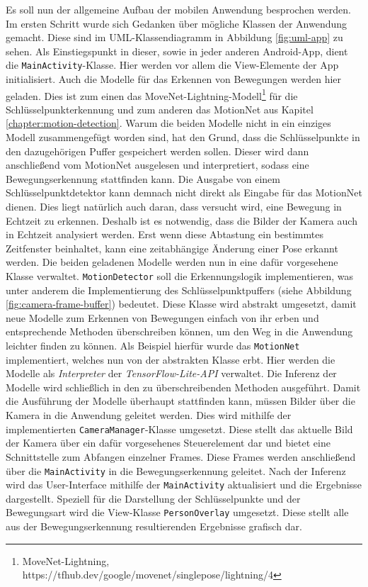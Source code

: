 Es soll nun der allgemeine Aufbau der mobilen Anwendung besprochen werden. Im
ersten Schritt wurde sich Gedanken über mögliche Klassen der Anwendung gemacht.
Diese sind im UML-Klassendiagramm in Abbildung \ref{fig:uml-app} zu sehen. Als
Einstiegspunkt in dieser, sowie in jeder anderen Android-App, dient die
\texttt{MainActivity}-Klasse. Hier werden vor allem die View-Elemente der App
initialisiert. Auch die Modelle für das Erkennen von Bewegungen werden hier
geladen. Dies ist zum einen das MoveNet-Lightning-Modell\footnote{MoveNet-Lightning, https://tfhub.dev/google/movenet/singlepose/lightning/4} für die
Schlüsselpunkterkennung und zum anderen das MotionNet aus Kapitel
\ref{chapter:motion-detection}. Warum die beiden Modelle nicht in ein einziges
Modell zusammengefügt worden sind, hat den Grund, dass die Schlüsselpunkte in
den dazugehörigen Puffer gespeichert werden sollen. Dieser wird dann
anschließend vom MotionNet ausgelesen und interpretiert, sodass eine
Bewegungserkennung stattfinden kann. Die Ausgabe von einem
Schlüsselpunktdetektor kann demnach nicht direkt als Eingabe für das MotionNet
dienen. Dies liegt natürlich auch daran, dass versucht wird, eine Bewegung in
Echtzeit zu erkennen. Deshalb ist es notwendig, dass die Bilder der Kamera auch
in Echtzeit analysiert werden. Erst wenn diese Abtastung ein bestimmtes
Zeitfenster beinhaltet, kann eine zeitabhängige Änderung einer Pose erkannt
werden. Die beiden geladenen Modelle werden nun in eine dafür vorgesehene Klasse
verwaltet. \texttt{MotionDetector} soll die Erkennungslogik implementieren, was
unter anderem die Implementierung des Schlüsselpunktpuffers (siehe Abbildung
\ref{fig:camera-frame-buffer}) bedeutet. Diese Klasse wird abstrakt umgesetzt,
damit neue Modelle zum Erkennen von Bewegungen einfach von ihr erben und
entsprechende Methoden überschreiben können, um den Weg in die Anwendung
leichter finden zu können. Als Beispiel hierfür wurde das \texttt{MotionNet}
implementiert, welches nun von der abstrakten Klasse erbt. Hier werden die
Modelle als \textit{Interpreter} der \textit{TensorFlow-Lite-API} verwaltet. Die
Inferenz der Modelle wird schließlich in den zu überschreibenden Methoden
ausgeführt. Damit die Ausführung der Modelle überhaupt stattfinden kann, müssen
Bilder über die Kamera in die Anwendung geleitet werden. Dies wird mithilfe der
implementierten \texttt{CameraManager}-Klasse umgesetzt. Diese stellt das
aktuelle Bild der Kamera über ein dafür vorgesehenes Steuerelement dar und
bietet eine Schnittstelle zum Abfangen einzelner Frames. Diese Frames werden
anschließend über die \texttt{MainActivity} in die Bewegungserkennung geleitet.
Nach der Inferenz wird das User-Interface mithilfe der \texttt{MainActivity}
aktualisiert und die Ergebnisse dargestellt. Speziell für die Darstellung der
Schlüsselpunkte und der Bewegungsart wird die View-Klasse \texttt{PersonOverlay}
umgesetzt. Diese stellt alle aus der Bewegungserkennung resultierenden
Ergebnisse grafisch dar.

